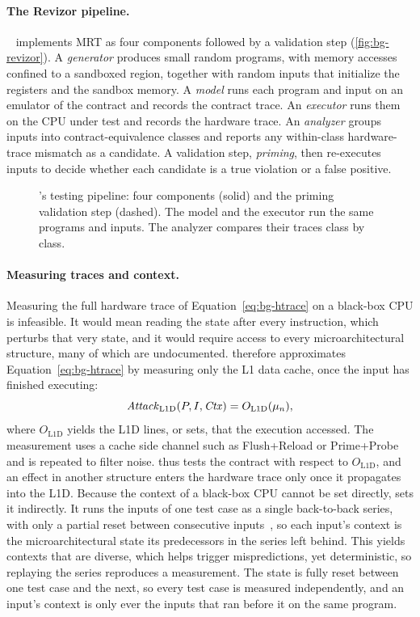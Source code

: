 \paragraph{The Revizor pipeline.}
\revizor{}~\cite{revizor} implements MRT as four components followed by a validation
step (\autoref{fig:bg-revizor}). A \emph{generator} produces small random programs, with memory
accesses confined to a sandboxed region, together with random inputs that initialize the registers
and the sandbox memory. A \emph{model} runs each program and input on an emulator of the contract
and records the contract trace. An \emph{executor} runs them on the CPU under test and records the
hardware trace. An \emph{analyzer} groups inputs into contract-equivalence classes and reports any
within-class hardware-trace mismatch as a candidate. A validation step, \emph{priming}, then
re-executes inputs to decide whether each candidate is a true violation or a false positive.

\begin{figure}[t]
\centering
\fitwidth{}
\caption{\revizor{}'s testing pipeline: four components (solid) and the priming validation step
(dashed). The model and the executor run the same programs and inputs. The analyzer compares their
traces class by class.}
\label{fig:bg-revizor}
\end{figure}

\paragraph{Measuring traces and context.}
Measuring the full hardware trace of Equation~\eqref{eq:bg-htrace} on a black-box CPU is
infeasible. It would mean reading the state after every instruction, which perturbs that very
state, and it would require access to every microarchitectural structure, many of which are
undocumented. \revizor{} therefore approximates Equation~\eqref{eq:bg-htrace} by measuring only the
L1 data cache, once the input has finished executing:
\begin{equation}
\mathit{Attack}_{\mathrm{L1D}}(P,I,\mathit{Ctx}) = O_{\mathrm{L1D}}(\mu_n),
\label{eq:bg-htrace-l1d}
\end{equation}
where $O_{\mathrm{L1D}}$ yields the L1D lines, or sets, that the execution accessed. The
measurement uses a cache side channel such as Flush+Reload or Prime+Probe and is repeated to filter
noise. \revizor{} thus tests the contract with respect to $O_{\mathrm{L1D}}$, and an effect in
another structure enters the hardware trace only once it propagates into the L1D. Because the context of a black-box CPU
cannot be set directly, \revizor{} sets it indirectly. It runs the inputs of one test case as a
single back-to-back series, with only a partial reset between consecutive inputs~\cite{revizor,hide_seek},
so each input's context is the microarchitectural state its predecessors in the series left behind.
This yields contexts that are diverse, which helps trigger mispredictions, yet deterministic, so
replaying the series reproduces a measurement.
The state is fully reset between one test case and the next, so every test case is measured
independently, and an input's context is only ever the inputs that ran before it on the same program.

